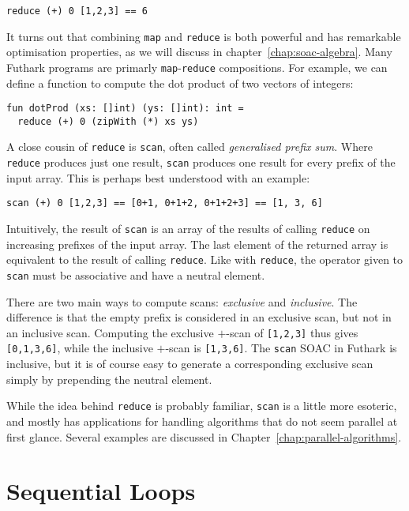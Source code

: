 \documentclass[oneside,11pt]{book}
\begin{document}
\begin{lstlisting}
reduce (+) 0 [1,2,3] == 6
\end{lstlisting}

It turns out that combining \texttt{map} and \texttt{reduce} is both
powerful and has remarkable optimisation properties, as we will
discuss in chapter~\ref{chap:soac-algebra}.  Many Futhark programs are
primarly \texttt{map}-\texttt{reduce} compositions.  For example, we
can define a function to compute the dot product of two vectors of
integers:

\begin{lstlisting}
fun dotProd (xs: []int) (ys: []int): int =
  reduce (+) 0 (zipWith (*) xs ys)
\end{lstlisting}

A close cousin of \texttt{reduce} is \texttt{scan}, often called
\textit{generalised prefix sum}.  Where \texttt{reduce} produces just
one result, \texttt{scan} produces one result for every prefix of the
input array.  This is perhaps best understood with an example:

\begin{lstlisting}
scan (+) 0 [1,2,3] == [0+1, 0+1+2, 0+1+2+3] == [1, 3, 6]
\end{lstlisting}

Intuitively, the result of \texttt{scan} is an array of the results of calling
\texttt{reduce} on increasing prefixes of the input array.  The last
element of the returned array is equivalent to the result of calling
\texttt{reduce}. Like with \texttt{reduce}, the operator given to
\texttt{scan} must be associative and have a neutral element.

There are two main ways to compute scans: \textit{exclusive} and
\textit{inclusive}.  The difference is that the empty prefix is
considered in an exclusive scan, but not in an inclusive scan.
Computing the exclusive $+$-scan of \texttt{[1,2,3]} thus gives
\texttt{[0,1,3,6]}, while the inclusive $+$-scan is \texttt{[1,3,6]}.
The \texttt{scan} SOAC in Futhark is inclusive, but it is of course
easy to generate a corresponding exclusive scan simply by prepending
the neutral element.

While the idea behind \texttt{reduce} is probably familiar,
\texttt{scan} is a little more esoteric, and mostly has applications
for handling algorithms that do not seem parallel at first glance.
Several examples are discussed in
Chapter~\ref{chap:parallel-algorithms}.

\section{Sequential Loops}
\label{sec:sequential-loops}
\end{document}
